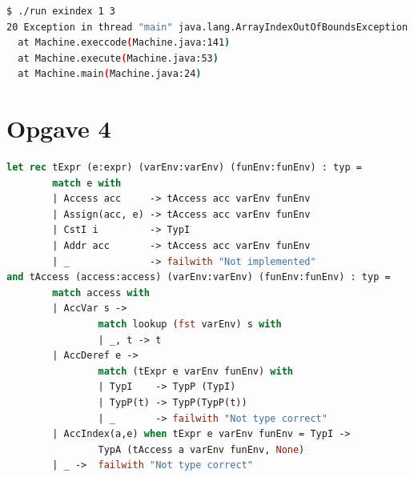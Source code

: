 \documentclass[danish,a4paper]{report}
\begin{document}
\begin{lstlisting}[language=bash]
$ ./run exindex 1 3
20 Exception in thread "main" java.lang.ArrayIndexOutOfBoundsException: Array index out of range: 3
  at Machine.execcode(Machine.java:141)
  at Machine.execute(Machine.java:53)
  at Machine.main(Machine.java:24)
\end{lstlisting}



\chapter*{Opgave 4}

\begin{lstlisting}[language=ML]
let rec tExpr (e:expr) (varEnv:varEnv) (funEnv:funEnv) : typ = 
        match e with
        | Access acc     -> tAccess acc varEnv funEnv
        | Assign(acc, e) -> tAccess acc varEnv funEnv
        | CstI i         -> TypI
        | Addr acc       -> tAccess acc varEnv funEnv
        | _              -> failwith "Not implemented"
and tAccess (access:access) (varEnv:varEnv) (funEnv:funEnv) : typ =
        match access with
        | AccVar s -> 
                match lookup (fst varEnv) s with
                | _, t -> t
        | AccDeref e -> 
                match (tExpr e varEnv funEnv) with
                | TypI    -> TypP (TypI)
                | TypP(t) -> TypP(TypP(t))
                | _       -> failwith "Not type correct"
        | AccIndex(a,e) when tExpr e varEnv funEnv = TypI -> 
                TypA (tAccess a varEnv funEnv, None)
        | _ ->  failwith "Not type correct"
\end{lstlisting}

\label{LastPage}
\end{document}
